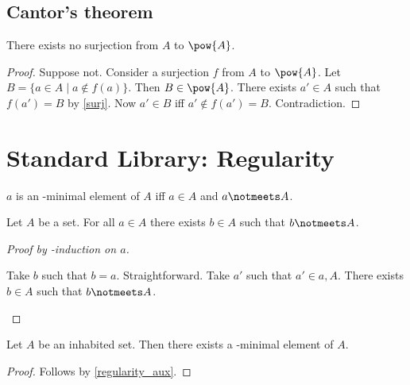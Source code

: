\subsection{Cantor's theorem}


\begin{theorem}[Cantor]\label{cantor}
    There exists no surjection from $A$ to $\pow{A}$.
\end{theorem}
\begin{proof}
    Suppose not.
    Consider a surjection $f$ from $A$ to $\pow{A}$.
    Let $B = \{a \in A \mid a\notin f(a)\}$.
    Then $B\in\pow{A}$.
    There exists $a'\in A$ such that $f(a') = B$ by \cref{surj}.
    Now $a' \in B$ iff $a' \notin f(a') = B$.
    Contradiction.
\end{proof}
\section{Standard Library: Regularity}

\begin{abbreviation}\label{elemminimal}
    $a$ is an \in-minimal element of $A$ iff
    $a\in A$ and $a\notmeets A$.
\end{abbreviation}

\begin{lemma}\label{regularity_aux}
    Let $A$ be a set.
    For all $a\in A$ there exists $b\in A$ such that
    $b\notmeets A$.
\end{lemma}
\begin{proof}[Proof by \in-induction on $a$]
    \begin{byCase}
            Take $b$ such that $b = a$.
            Straightforward.
            Take $a'$ such that $a'\in a, A$.
            There exists $b\in A$ such that $b\notmeets A$.
    \end{byCase}
\end{proof}

\begin{proposition}[Regularity]%
\label{regularity}
    Let $A$ be an inhabited set.
    Then there exists a \in-minimal element of $A$.
\end{proposition}
\begin{proof}
    Follows by \cref{regularity_aux}.
\end{proof}


